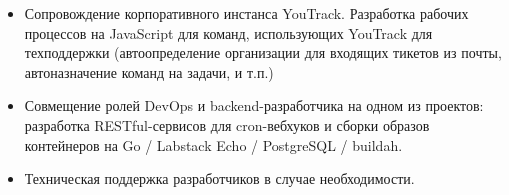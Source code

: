 {\begin{itemize}
        / Grafana) и специфичных для проектов (Logstash / Elasticsearch / Prometheus / Grafana)
        сервисов мониторинга и логгирования. Сопровождение специфичного для команд мониторинга
        (Oracle XE).
    \item
        Сопровождение корпоративного инстанса YouTrack. Разработка рабочих процессов на
        JavaScript для команд, использующих YouTrack для техподдержки (автоопределение организации
        для входящих тикетов из почты, автоназначение команд на задачи, и т.п.)
    \item
        Совмещение ролей DevOps и backend-разработчика на одном из проектов: разработка
        RESTful-сервисов для cron-вебхуков и сборки образов контейнеров на Go / Labstack Echo
        / PostgreSQL / buildah.
    \item
        Техническая поддержка разработчиков в случае необходимости.
    \end{itemize}
}
